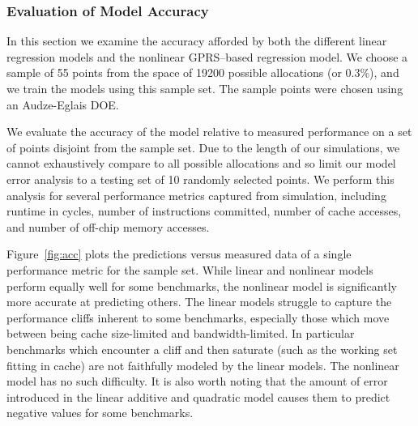 \subsubsection*{Evaluation of Model Accuracy}
In this section we examine the accuracy afforded by both the different linear regression models and the nonlinear GPRS--based regression model.  We choose a sample of 55 points from the space of 19200 possible allocations (or 0.3\%), and we train the models using this sample set.  The sample points were chosen using an Audze-Eglais DOE.

We evaluate the accuracy of the model relative to measured performance on a set of points disjoint from the sample set.  Due to the length of our simulations, we cannot exhaustively compare to all possible allocations and so limit our model error analysis to a testing set of 10 randomly selected points.  We perform this analysis for several performance metrics captured from simulation, including runtime in cycles, number of instructions committed, number of cache accesses, and number of off-chip memory accesses.

 Figure~\ref{fig:acc} plots the predictions versus measured data of a single performance metric for the sample set. While linear and nonlinear models perform equally well for some benchmarks, the nonlinear model is significantly more accurate at predicting others. The linear models struggle to capture the performance cliffs inherent to some benchmarks, especially those which move between being cache size-limited and bandwidth-limited.  In particular benchmarks which encounter a cliff and then saturate (such as the working set fitting in cache) are not faithfully modeled by the linear models.  The nonlinear model has no such difficulty.  It is also worth noting that the amount of error introduced in the linear additive and quadratic model causes them to predict negative values for some benchmarks.

